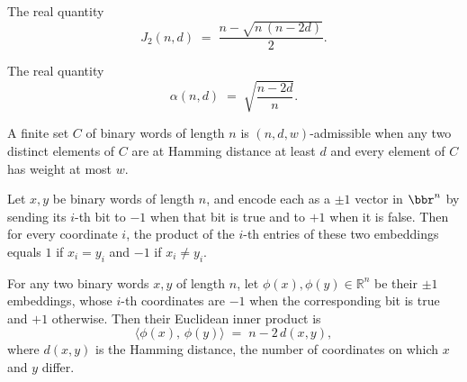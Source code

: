 \begin{definition}
\label{CodingTheory.Johnson.J2}
\leanok
The real quantity
\[
J_2(n,d) \;=\; \frac{n - \sqrt{n\,(n - 2d)}}{2}.
\]
\end{definition}

\begin{definition}
\label{CodingTheory.Johnson.alpha}
\leanok
The real quantity
\[
\alpha(n,d) \;=\; \sqrt{\frac{n - 2d}{n}}.
\]
\end{definition}

\begin{definition}
\label{CodingTheory.Johnson.AdmissibleCode}
\leanok
{}
A finite set $C$ of binary words of length $n$ is $(n,d,w)$-admissible when any two
distinct elements of $C$ are at Hamming distance at least $d$ and every element of
$C$ has weight at most $w$.
\end{definition}

\begin{lemma}
\label{CodingTheory.Johnson.coord_mul_pmOne}
\leanok
{}
Let $x, y$ be binary words of length $n$, and encode each as a $\pm 1$ vector in
$\bbr^n$ by sending its $i$-th bit to $-1$ when that bit is true and to $+1$ when it is
false. Then for every coordinate $i$, the product of the $i$-th entries of these two
embeddings equals $1$ if $x_i = y_i$ and $-1$ if $x_i \ne y_i$.
\end{lemma}

\begin{lemma}
\label{CodingTheory.Johnson.inner_pmOne_pmOne}
\leanok
{}
For any two binary words $x, y$ of length $n$, let $\phi(x), \phi(y) \in \mathbb{R}^n$
be their $\pm 1$ embeddings, whose $i$-th coordinates are $-1$ when the corresponding
bit is true and $+1$ otherwise. Then their Euclidean inner product is
\[
\langle \phi(x),\, \phi(y)\rangle \;=\; n - 2\,d(x,y),
\]
where $d(x,y)$ is the Hamming distance, the number of coordinates on which $x$ and $y$
differ.
\end{lemma}

